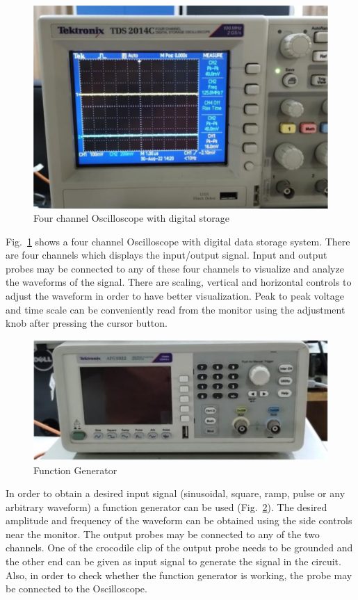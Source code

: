 \documentclass[9pt]{scrreprt}
\begin{document}
\begin{figure}[H]
	\centering
	\includegraphics[width=0.6\linewidth]{logos/Oscilloscope.png}
	\caption{Four channel Oscilloscope with digital storage}
	\label{fig:Oscilloscope}
\end{figure}


Fig.~\ref{fig:Oscilloscope} shows a four channel Oscilloscope with digital data storage system. There are four
channels which displays the input/output signal. Input and output probes may be connected to any of these
four channels to visualize and analyze the waveforms of the signal. There are scaling, vertical and
horizontal controls to adjust the waveform in order to have better visualization. Peak to peak voltage and
time scale can be conveniently read from the monitor using the adjustment knob after pressing the cursor
button.

\begin{figure}[H]
	\centering
	\includegraphics[width=0.7\linewidth]{logos/Function_Generator.png}
	\caption{Function Generator}
	\label{fig:Function_Generator}
\end{figure}

In order to obtain a desired input signal (sinusoidal, square, ramp, pulse or any arbitrary waveform) a function generator can be used (Fig.~\ref{fig:Function_Generator}). The desired amplitude and frequency of the waveform can be obtained using the side controls near the monitor. The output probes may be connected to any of the two channels. One of the crocodile clip of the output probe needs to be grounded and the other end can be given as input signal to generate the signal in the circuit. Also, in order to check whether the function generator is working, the probe may be connected to the Oscilloscope.\\
\\
\end{document}
